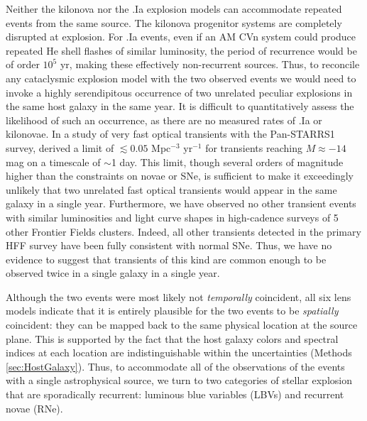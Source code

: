 Neither the kilonova nor the .Ia explosion models can accommodate
repeated events from the same source. The kilonova progenitor
systems are completely disrupted at explosion.  For .Ia events, even
if an AM CVn system could produce repeated He shell flashes of similar
luminosity, the period of recurrence would be of order $10^5$ yr,
making these effectively non-recurrent sources.  Thus, to reconcile
any cataclysmic explosion model with the two observed \spock events
we would need to invoke a highly serendipitous occurrence of two
unrelated peculiar explosions in the same host galaxy in the same
year. It is difficult to quantitatively assess the likelihood of such
an occurrence, as there are no measured rates of .Ia or kilonovae.  In
a study of very fast optical transients with the Pan-STARRS1 survey,
\citet{Berger:2013b} derived a limit of $\lesssim0.05$ Mpc$^{-3}$
yr$^{-1}$ for transients reaching $M\approx -14$ mag on a timescale of
$\sim$1 day.  This limit, though several orders of magnitude higher
than the constraints on novae or SNe, is sufficient to make it
exceedingly unlikely that two unrelated fast optical transients would
appear in the same galaxy in a single year.  Furthermore, we have
observed no other transient events with similar luminosities and light
curve shapes in high-cadence surveys of 5 other Frontier Fields
clusters. Indeed, all other transients detected in the primary HFF
survey have been fully consistent with normal SNe.  Thus, we have no
evidence to suggest that transients of this kind are common enough to
be observed twice in a single galaxy in a single year.



Although the two events were most likely not {\it temporally}
coincident, all six lens models indicate that it is entirely
plausible for the two \spock events to be {\it spatially} coincident: they
can be mapped back to the same physical location at the source
plane. This is supported by the fact that the host galaxy colors and
spectral indices at each \spock location are indistinguishable within
the uncertainties (Methods \ref{sec:HostGalaxy}).  
Thus, to accommodate all of the observations of the \spock events with
a single astrophysical source, we turn to two categories of
stellar explosion that are sporadically recurrent: luminous blue
variables (LBVs) and recurrent novae (RNe).


